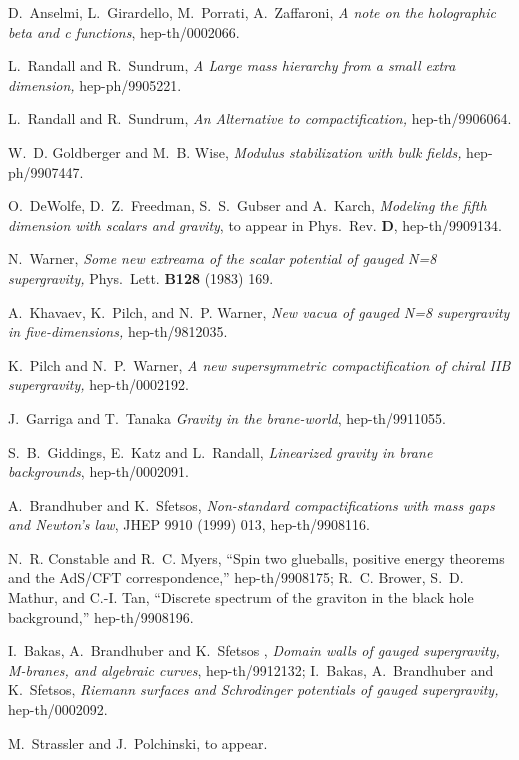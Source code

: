 \documentclass[a4paper,12pt]{article}
\begin{document}
\begin{thebibliography}{99}
 D.~Anselmi, L.~Girardello, M.~Porrati, A.~Zaffaroni,
{\em A note on the holographic beta and c functions}, hep-th/0002066.

 L.~Randall and R.~Sundrum, {\em A Large mass hierarchy
from a small extra dimension,} hep-ph/9905221.

 L.~Randall and R.~Sundrum, {\em An Alternative to
compactification,} hep-th/9906064.

 W.~D. Goldberger and M.~B. Wise, {\em Modulus
stabilization with bulk fields,} hep-ph/9907447.

 O.~DeWolfe, D.~Z.~Freedman, S.~S.~Gubser and A.~Karch,
{\em Modeling the fifth dimension with scalars and gravity}, to appear
in Phys.~Rev. {\bf D}, hep-th/9909134.


 N.~Warner, {\em Some new extreama of the scalar
potential of gauged N=8 supergravity,} Phys.~Lett. {\bf B128} (1983)
169.

 A.~Khavaev, K.~Pilch, and N.~P. Warner, {\em New vacua
of gauged N=8 supergravity in five-dimensions,} hep-th/9812035.

 K.~Pilch and N.~P.~Warner, {\em A new
supersymmetric compactification of chiral IIB supergravity,}
hep-th/0002192.


 J.~Garriga and T.~Tanaka {\em Gravity in the
brane-world}, hep-th/9911055.

 S.~B.~Giddings, E.~Katz and L.~Randall, {\em Linearized
gravity in brane backgrounds}, hep-th/0002091.

 A.~Brandhuber and K.~Sfetsos, {\em Non-standard
compactifications with mass gaps and Newton's law}, JHEP 9910 (1999)
013, hep-th/9908116.

N.~R. Constable and R.~C. Myers, ``Spin two glueballs, positive energy theorems
  and the AdS/CFT correspondence,'' hep-th/9908175; \hfill \break
R.~C. Brower, S.~D. Mathur, and C.-I. Tan, ``Discrete spectrum of the graviton
  in the \coordHE{} black hole background,''
hep-th/9908196.


 I.~Bakas, A.~Brandhuber and K.~Sfetsos , {\em Domain
walls of gauged supergravity, M-branes, and algebraic curves},
hep-th/9912132; \hfill \break I.~Bakas, A.~Brandhuber and K.~Sfetsos,
{\em Riemann surfaces and Schrodinger potentials of gauged
supergravity,} hep-th/0002092.

 M.~Strassler and J.~Polchinski, to appear.


\end{thebibliography}
\end{document}
